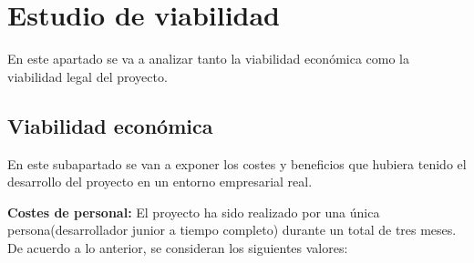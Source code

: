 \section{Estudio de viabilidad}
En este apartado se va a analizar tanto la viabilidad económica como la viabilidad legal del proyecto.


\subsection{Viabilidad económica} 
En este subapartado se van a exponer los costes y beneficios que hubiera tenido el desarrollo del proyecto en un entorno empresarial real. 

\textbf{Costes de personal:}
El proyecto ha sido realizado por una única persona(desarrollador junior a tiempo completo) durante un total de tres meses.
De acuerdo a lo anterior, se consideran los siguientes valores:

